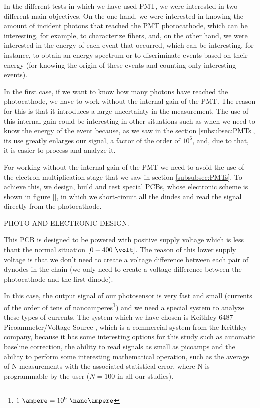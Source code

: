 In the different tests in which we have used PMT, we were interested in two different main objectives. On the one hand, we were interested in knowing the amount of incident photons that reached the PMT photocathode, which can be interesting, for example, to characterize fibers, and, on the other hand, we were interested in the energy of each event that occurred, which can be interesting, for instance, to obtain an energy spectrum or to discriminate events based on their energy (for knowing the origin of these events and counting only interesting events).

In the first case, if we want to know how many photons have reached the photocathode, we have to work without the internal gain of the PMT. The reason for this is that it introduces a large uncertainty in the measurement. The use of this internal gain could be interesting in other situations such as when we need to know the energy of the event because, as we saw in the section \ref{subsubsec:PMTs}, its use greatly enlarges our signal, a factor of the order of $10^6$, and, due to that, it is easier to process and analyze it.

For working without the internal gain of the PMT we need to avoid the use of the electron multiplication stage that we saw in section \ref{subsubsec:PMTs}. To achieve this, we design, build and test special PCBs, whose electronic scheme is shown in figure \ref{}, in which we short-circuit all the dindes and read the signal directly from the photocathode.

PHOTO AND ELECTRONIC DESIGN.

This PCB is designed to be powered with positive supply voltage which is less thant the normal situation $[0-400~\volt]$. The reason of this lower supply voltage is that we don't need to create a voltage difference between each pair of dynodes in the chain (we only need to create a voltage difference between the photocathode and the first dinode).

In this case, the output signal of our photosensor is very fast and small (currents of the order of tens of nanoamperes\footnote{$1~\ampere=10^{9}~\nano\ampere$}) and we need a special system to analyze these types of currents. The system which we have chosen is Keithley 6487 Picoammeter/Voltage Source \cite{DataSheetKeithley6487}, which is a commercial system from the Keithley company, because it has some interesting options for this study such as automatic baseline correction, the ability to read signals as small as picoamps and the ability to perform some interesting mathematical operation, such as the average of N measurements with the associated statistical error, where N is programmable by the user ($N=100$ in all our studies).

